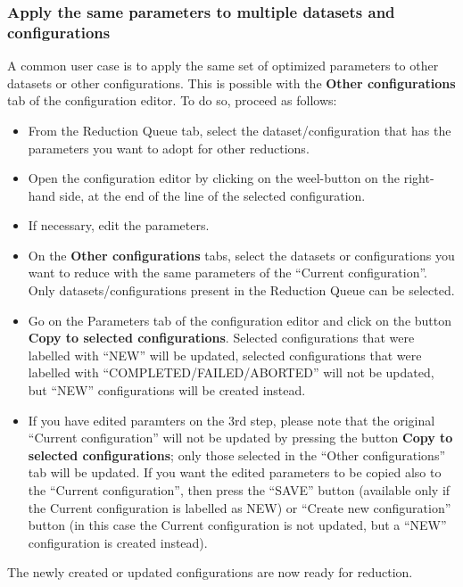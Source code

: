 
\subsubsection{Apply the same parameters to multiple datasets and configurations}

A common user case is to apply the same set of optimized parameters to
other datasets or other configurations. This is possible with the {\bf
  Other configurations} tab of the configuration editor.
To do so, proceed as follows:
\begin{itemize}
\item From the Reduction Queue tab, select the dataset/configuration
  that has the parameters you want to adopt for other
  reductions.
  \item Open the configuration editor by clicking on the weel-button
    on the right-hand side, at the end of the line of the selected
    configuration.
  \item If necessary, edit the parameters.
  \item On the {\bf Other configurations} tabs, select the datasets or
    configurations you want to reduce with the same parameters of the
    ``Current configuration''. Only datasets/configurations present in
    the Reduction Queue can be selected.
  \item Go on the Parameters tab of the configuration editor and click
    on the button {\bf Copy to selected configurations}. Selected
    configurations that were labelled with ``NEW'' will be updated,
    selected configurations that were labelled with
    ``COMPLETED/FAILED/ABORTED'' will not be updated, but ``NEW''
    configurations will be created instead.
  \item If you have edited paramters on the 3rd step, please note that
    the original ``Current configuration'' will not be updated by
    pressing the button {\bf Copy to selected configurations}; only
    those selected in the ``Other configurations'' tab will be
    updated. If you want the edited parameters to be copied also to
    the ``Current configuration'', then press the ``SAVE'' button
    (available only if the Current configuration is labelled as NEW)
    or ``Create new configuration'' button (in this case the Current
    configuration is not updated, but a ``NEW'' configuration is
    created instead).
  
\end{itemize}

The newly created or updated configurations are now ready for
reduction.
